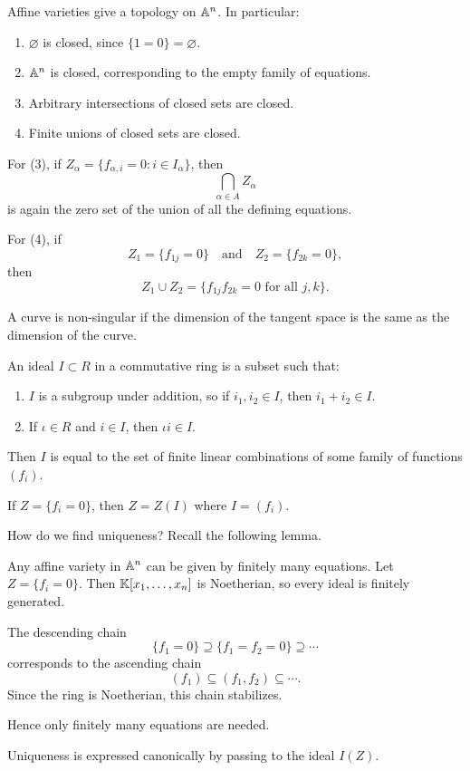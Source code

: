 \begin{proposition}{
    Affine varieties give a topology on $\aa^n$.
    In particular:
    \begin{enumerate}[label={(\arabic*)}]
    \item $\varnothing$ is closed, since $\{1 = 0\} = \varnothing$.
    \item $\aa^n$ is closed, corresponding to the empty family of equations.
    \item Arbitrary intersections of closed sets are closed.
    \item Finite unions of closed sets are closed.
    \end{enumerate}
}
    For (3), if $Z_\alpha = \{f_{\alpha,i} = 0 : i\in I_\alpha\}$, then
    \[
        \bigcap_{\alpha\in A} Z_\alpha
    \]
    is again the zero set of the union of all the defining equations.

    For (4), if
    \[
        Z_1 = \{f_{1j} = 0\}
        \quad\text{and}\quad
        Z_2 = \{f_{2k} = 0\},
    \]
    then
    \[
        Z_1\cup Z_2 = \{f_{1j}f_{2k} = 0 \text{ for all } j,k\}.
    \]
\end{proposition}

\begin{lemma*}{
    A curve is non-singular if the dimension of the tangent space is the same as the dimension of the curve.
}
\end{lemma*}

\begin{definition}[Ideal]
    An ideal $I\subset R$ in a commutative ring is a subset such that:
    \begin{enumerate}
        \item $I$ is a subgroup under addition, so if $i_1,i_2\in I$, then $i_1+i_2\in I$.
        \item If $\iota\in R$ and $i\in I$, then $\iota i\in I$.
    \end{enumerate}
\end{definition}

Then $I$ is equal to the set of finite linear combinations of some family of functions $(f_i)$.

\begin{proposition*}{
    If $Z = \{f_i = 0\}$, then $Z = Z(I)$ where $I = (f_i)$.
}
\end{proposition*}

How do we find uniqueness?
Recall the following lemma.

\begin{lemma}{
    Any affine variety in $\aa^n$ can be given by finitely many equations.
}
    Let $Z = \{f_i = 0\}$.
    Then $\kk[x_1,\ldots,x_n]$ is Noetherian, so every ideal is finitely generated.

    The descending chain
    \[
        \{f_1 = 0\}\supseteq \{f_1 = f_2 = 0\}\supseteq \cdots
    \]
    corresponds to the ascending chain
    \[
        (f_1)\subseteq (f_1,f_2)\subseteq \cdots.
    \]
    Since the ring is Noetherian, this chain stabilizes.

    Hence only finitely many equations are needed.

    Uniqueness is expressed canonically by passing to the ideal $I(Z)$.
\end{lemma}

